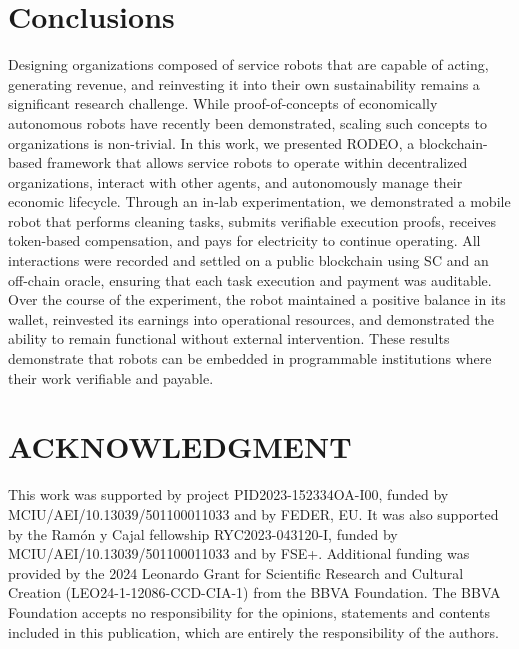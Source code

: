 \documentclass[letterpaper, 10 pt, conference]{ieeeconf}  %
\begin{document}
\section{Conclusions}
Designing organizations composed of service robots that are capable of acting, generating revenue, and reinvesting it into their own sustainability remains a significant research challenge. While proof-of-concepts of economically autonomous robots have recently been demonstrated, scaling such concepts to organizations is non-trivial. In this work, we presented RODEO, a blockchain-based framework that allows service robots to operate within decentralized organizations, interact with other agents, and autonomously manage their economic lifecycle. Through an in-lab experimentation, we demonstrated a mobile robot that performs cleaning tasks, submits verifiable execution proofs, receives token-based compensation, and pays for electricity to continue operating. All interactions were recorded and settled on a public blockchain using SC and an off-chain oracle, ensuring that each task execution and payment was auditable. Over the course of the experiment, the robot maintained a positive balance in its wallet, reinvested its earnings into operational resources, and demonstrated the ability to remain functional without external intervention. These results demonstrate that robots can be embedded in programmable institutions where their work verifiable and payable.








\section*{ACKNOWLEDGMENT}
This work was supported by project PID2023-152334OA-I00, funded by MCIU/AEI/10.13039/501100011033 and by FEDER, EU. It was also supported by the Ramón y Cajal fellowship RYC2023-043120-I, funded by MCIU/AEI/10.13039/501100011033 and by FSE+. Additional funding was provided by the 2024 Leonardo Grant for Scientific Research and Cultural Creation (LEO24-1-12086-CCD-CIA-1) from the BBVA Foundation. The BBVA Foundation accepts no responsibility for the opinions, statements and contents included in this publication, which are entirely the responsibility of the authors.





\end{document}

